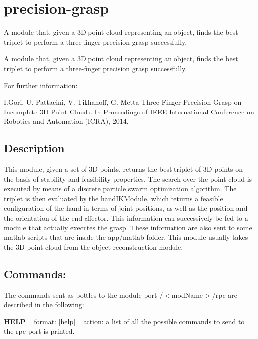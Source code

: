\section{precision-\/grasp}
\label{group__precision-grasp}


A module that, given a 3\+D point cloud representing an object, finds the best triplet to perform a three-\/finger precision grasp successfully.  


A module that, given a 3\+D point cloud representing an object, finds the best triplet to perform a three-\/finger precision grasp successfully. 

For further information\+:

I.\+Gori, U. Pattacini, V. Tikhanoff, G. Metta Three-\/\+Finger Precision Grasp on Incomplete 3\+D Point Clouds. In Proceedings of I\+E\+E\+E International Conference on Robotics and Automation (I\+C\+R\+A), 2014.\hypertarget{group__handIKModule_intro_sec}{}\subsection{Description}\label{group__handIKModule_intro_sec}
This module, given a set of 3\+D points, returns the best triplet of 3\+D points on the basis of stability and feasibility properties. The search over the point cloud is executed by means of a discrete particle swarm optimization algorithm. The triplet is then evaluated by the hand\+I\+K\+Module, which returns a feasible configuration of the hand in terms of joint positions, as well as the position and the orientation of the end-\/effector. This information can successively be fed to a module that actually executes the grasp. These information are also sent to some matlab scripts that are inside the app/matlab folder. This module usually takes the 3\+D point cloud from the object-\/reconstruction module.\hypertarget{group__handIKModule_rpc_port}{}\subsection{Commands\+:}\label{group__handIKModule_rpc_port}
The commands sent as bottles to the module port /$<$mod\+Name$>$/rpc are described in the following\+:

{\bfseries H\+E\+L\+P} ~\newline
format\+: \mbox{[}help\mbox{]} ~\newline
action\+: a list of all the possible commands to send to the rpc port is printed.


